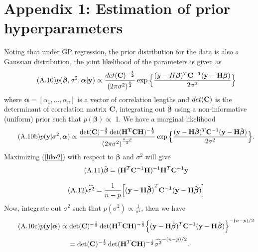 \documentclass[12pt,titlepage]{report}
\newcommand{\bH}{{\bf H}}
\newcommand{\bC}{{\bf C}}
\newcommand{\by}{{\bf y}}
\newcommand{\hbbeta}{{\hat{\boldsymbol{\beta}}}}
\theoremstyle{definition}
\theoremstyle{remark}
\begin{document}
\section*{Appendix 1: Estimation of prior hyperparameters}\label{hyper}
Noting that under GP regression, the prior distribution for the data is also a Gaussian distribution, the joint likelihood of the parameters is given as
\begin{equation}\tag{A.10}\label{like}
p(\boldsymbol \beta, \sigma^2, \boldsymbol{\alpha}|\by)\propto \frac{det(\bf C)^{-\frac{1}{2}}}{{(2\pi\sigma^2)}^\frac{n}{2}}\exp \Big \{\frac{(y-H\boldsymbol \beta)^T \bf C^{-1}(\by-H\boldsymbol \beta)}{2\sigma^2}\Big\}
\end{equation}
where $\boldsymbol{\alpha}=[\alpha_1, \ldots, \alpha_n]$ is a vector of correlation lengths and $det(\bf C)$ is the determinant of correlation matrix $\bf C$, integrating out $\boldsymbol \beta$ using a non-informative (uniform) prior such that $p(\boldsymbol \beta) \propto$ 1. We have a marginal likelihood
\begin{equation}\tag{A.10b}\label{like2}
p(\by|\sigma^2, \boldsymbol{\alpha})\propto \frac{\det(\bf C)^{-\frac{1}{2}}\det(H^TCH)^{-\frac{1}{2}}}{{(2\pi\sigma^2)}^\frac{n-p}{2}}\exp \Big \{\frac{(\by-\bH\hbbeta)^T \bC^{-1}(\by-\bH\hbbeta)}{2\sigma^2}\Big\}.
\end{equation}
Maximizing (\ref{like2}) with respect to $\boldsymbol \beta$ and $\sigma^2$ will give %
\begin{equation}\tag{A.11}
\hbbeta=(\bH^T\bC^{-1}\bH)^{-1}\bH^T\bC^{-1}\by
\end{equation}

\begin{equation}\tag{A.12}
\widehat{\sigma^2}=\frac{1}{n-p}\Big[\mathbf{(y-H\hat{\boldsymbol \beta})}^T\bf C^{-1}(\bf y-H\hat{\boldsymbol \beta})\Big]
\end{equation}
Now, integrate out $\sigma^2$ such that $p(\sigma^2) \propto \frac{1}{\sigma^2}$, then we have
\begin{equation}\tag{A.10c}\label{like3}
p(\by|\boldsymbol{\alpha})\propto \det(\bC)^{-\frac{1}{2}}\det(\bH^T\bC\bH)^{-\frac{1}{2}} \Big \{(\by-\bH\hbbeta)^T \bC^{-1}(\by-\bH\hbbeta)\Big\}^{-(n-p)/2}
\end{equation}
$$=\det(\bC)^{-\frac{1}{2}}\det(\bH^T\bC\bH)^{-\frac{1}{2}} {\widehat{\sigma^2}}^{-(n-p)/2}.$$
\end{document}
